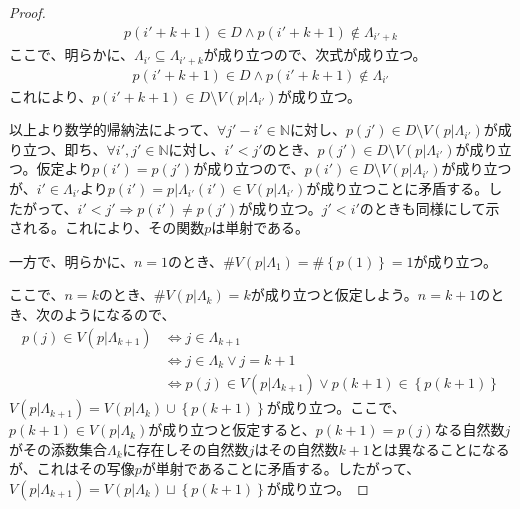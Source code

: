 \documentclass[dvipdfmx]{jsarticle}
\begin{document}
\begin{proof}
\begin{align*}
p\left( i' + k + 1 \right) \in D \land p\left( i' + k + 1 \right) \notin \varLambda_{i' + k}
\end{align*}
ここで、明らかに、$\varLambda_{i'} \subseteq \varLambda_{i' + k}$が成り立つので、次式が成り立つ。
\begin{align*}
p\left( i' + k + 1 \right) \in D \land p\left( i' + k + 1 \right) \notin \varLambda_{i'}
\end{align*}
これにより、$p\left( i' + k + 1 \right) \in D \setminus V\left( p|\varLambda_{i'} \right)$が成り立つ。\par
以上より数学的帰納法によって、$\forall j' - i' \in \mathbb{N}$に対し、$p\left( j' \right) \in D \setminus V\left( p|\varLambda_{i'} \right)$が成り立つ、即ち、$\forall i',j' \in \mathbb{N}$に対し、$i' < j'$のとき、$p\left( j' \right) \in D \setminus V\left( p|\varLambda_{i'} \right)$が成り立つ。仮定より$p\left( i' \right) = p\left( j' \right)$が成り立つので、$p\left( i' \right) \in D \setminus V\left( p|\varLambda_{i'} \right)$が成り立つが、$i' \in \varLambda_{i'}$より$p\left( i' \right) = p|\varLambda_{i'}\left( i' \right) \in V\left( p|\varLambda_{i'} \right)$が成り立つことに矛盾する。したがって、$i' < j' \Rightarrow p\left( i' \right) \neq p\left( j' \right)$が成り立つ。$j' < i'$のときも同様にして示される。これにより、その関数$p$は単射である。\par
一方で、明らかに、$n = 1$のとき、$\#{V\left( p|\varLambda_{1} \right)} = \#\left\{ p(1) \right\} = 1$が成り立つ。\par
ここで、$n = k$のとき、$\#{V\left( p|\varLambda_{k} \right)} = k$が成り立つと仮定しよう。$n = k + 1$のとき、次のようになるので、
\begin{align*}
p(j) \in V\left( p|\varLambda_{k + 1} \right) &\Leftrightarrow j \in \varLambda_{k + 1}\\
&\Leftrightarrow j \in \varLambda_{k} \vee j = k + 1\\
&\Leftrightarrow p(j) \in V\left( p|\varLambda_{k + 1} \right) \vee p(k + 1) \in \left\{ p(k + 1) \right\}
\end{align*}
$V\left( p|\varLambda_{k + 1} \right) = V\left( p|\varLambda_{k} \right) \cup \left\{ p(k + 1) \right\}$が成り立つ。ここで、$p(k + 1) \in V\left( p|\varLambda_{k} \right)$が成り立つと仮定すると、$p(k + 1) = p(j)$なる自然数$j$がその添数集合$\varLambda_{k}$に存在しその自然数$j$はその自然数$k + 1$とは異なることになるが、これはその写像$p$が単射であることに矛盾する。したがって、$V\left( p|\varLambda_{k + 1} \right) = V\left( p|\varLambda_{k} \right) \sqcup \left\{ p(k + 1) \right\}$が成り立つ。\par

\end{proof}
\end{document}
